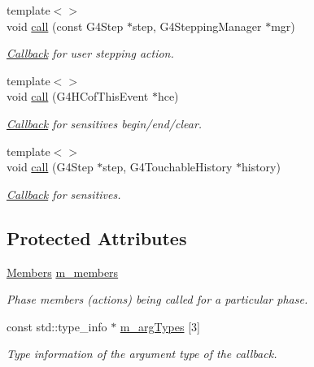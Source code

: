 \begin{DoxyCompactItemize}
{\footnotesize template$<$$>$ }\\void \hyperlink{class_d_d4hep_1_1_simulation_1_1_geant4_action_phase_aa63d358a785e614c0087a24203bd1821}{call} (const G4Step $\ast$step, G4SteppingManager $\ast$mgr)
\begin{DoxyCompactList}\small\item\em \hyperlink{class_d_d4hep_1_1_callback}{Callback} for user stepping action. \item\end{DoxyCompactList}\item 
{\footnotesize template$<$$>$ }\\void \hyperlink{class_d_d4hep_1_1_simulation_1_1_geant4_action_phase_a8bf0c8fb01a1f6f20a4297bcb8cb300e}{call} (G4HCofThisEvent $\ast$hce)
\begin{DoxyCompactList}\small\item\em \hyperlink{class_d_d4hep_1_1_callback}{Callback} for sensitives begin/end/clear. \item\end{DoxyCompactList}\item 
{\footnotesize template$<$$>$ }\\void \hyperlink{class_d_d4hep_1_1_simulation_1_1_geant4_action_phase_a23cbc92a4515243fc274f3a52f72dcc0}{call} (G4Step $\ast$step, G4TouchableHistory $\ast$history)
\begin{DoxyCompactList}\small\item\em \hyperlink{class_d_d4hep_1_1_callback}{Callback} for sensitives. \item\end{DoxyCompactList}\end{DoxyCompactItemize}
\subsection*{Protected Attributes}
\begin{DoxyCompactItemize}
\item 
\hyperlink{class_d_d4hep_1_1_simulation_1_1_geant4_action_phase_a4df9a501a5c2d810603cd58f5ff5157d}{Members} \hyperlink{class_d_d4hep_1_1_simulation_1_1_geant4_action_phase_a24b9ef3a3dbb361f17a5e2600dc6f57d}{m\_\-members}
\begin{DoxyCompactList}\small\item\em Phase members (actions) being called for a particular phase. \item\end{DoxyCompactList}\item 
const std::type\_\-info $\ast$ \hyperlink{class_d_d4hep_1_1_simulation_1_1_geant4_action_phase_a92e33c1a9f3cdbd49cf3b31a61213f57}{m\_\-argTypes} \mbox{[}3\mbox{]}
\begin{DoxyCompactList}\small\item\em Type information of the argument type of the callback. \item\end{DoxyCompactList}\end{DoxyCompactItemize}


